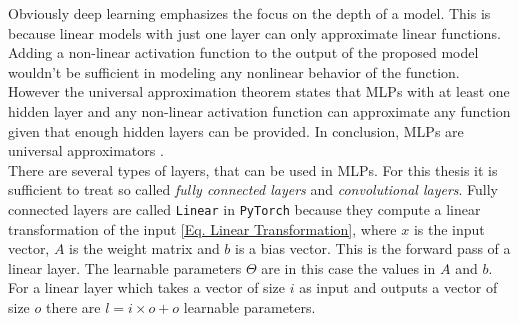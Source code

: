 \newpage
Obviously deep learning emphasizes the focus on the depth of a model. This is because linear models with just one layer can only approximate linear functions. Adding a non-linear activation function to the output of the proposed model wouldn't be sufficient in modeling any nonlinear behavior of the function. However the universal approximation theorem \cite{Hornik1989} states that MLPs with at least one hidden layer and any non-linear activation function can approximate any function given that enough hidden layers can be provided. In conclusion, MLPs are universal approximators \cite{Goodfellow}.\\
There are several types of layers, that can be used in MLPs. For this thesis it is sufficient to treat so called \textit{fully connected layers} and \textit{convolutional layers}.
Fully connected layers are called \texttt{Linear}\cite{bibid} in \texttt{PyTorch}\cite{bibid} because they compute a linear transformation of the input \cref{Eq. Linear Transformation}, where \(x\) is the input vector, \(A\) is the weight matrix and \(b\) is a bias vector. This is the forward pass of a linear layer. The learnable parameters \(\Theta\) are in this case the values in \(A\) and \(b\). For a linear layer which takes a vector of size \(i\) as input and outputs a vector of size \(o\) there are \(l = i \times o + o\) learnable parameters. 
